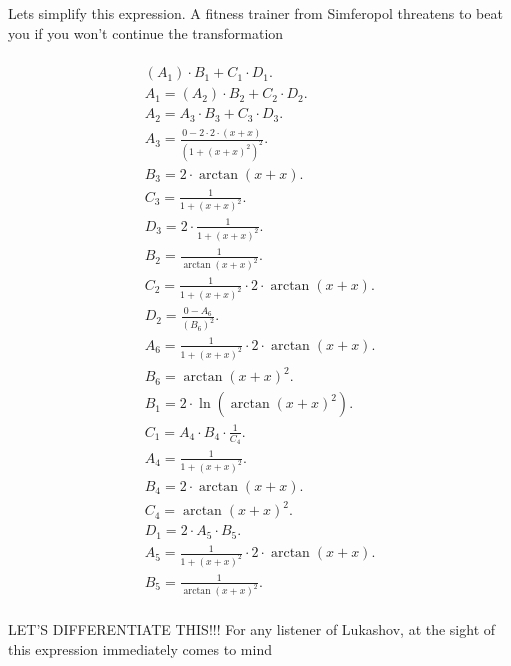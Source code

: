 \documentclass[12pt,a4paper]{extreport}
\begin{document}
Lets simplify this expression.
A fitness trainer from Simferopol\cite{SJ} threatens to beat you if you won't continue the transformation 

\begin{multline}
\\
(A_{1}) \cdot B_{1} + C_{1} \cdot D_{1}.\\
A_{1} = (A_{2}) \cdot B_{2} + C_{2} \cdot D_{2}.\\
A_{2} = A_{3} \cdot B_{3} + C_{3} \cdot D_{3}.\\
A_{3} = \frac{0 - 2 \cdot 2 \cdot (x + x)}{(1 + (x + x) ^ {2}) ^ {2}}.\\
B_{3} = 2 \cdot \arctan(x + x).\\
C_{3} = \frac{1}{1 + (x + x) ^ {2}}.\\
D_{3} = 2 \cdot \frac{1}{1 + (x + x) ^ {2}}.\\
B_{2} = \frac{1}{\arctan(x + x) ^ {2}}.\\
C_{2} = \frac{1}{1 + (x + x) ^ {2}} \cdot 2 \cdot \arctan(x + x).\\
D_{2} = \frac{0 - A_{6}}{(B_{6}) ^ {2}}.\\
A_{6} = \frac{1}{1 + (x + x) ^ {2}} \cdot 2 \cdot \arctan(x + x).\\
B_{6} = \arctan(x + x) ^ {2}.\\
B_{1} = 2 \cdot \ln(\arctan(x + x) ^ {2}).\\
C_{1} = A_{4} \cdot B_{4} \cdot \frac{1}{C_{4}}.\\
A_{4} = \frac{1}{1 + (x + x) ^ {2}}.\\
B_{4} = 2 \cdot \arctan(x + x).\\
C_{4} = \arctan(x + x) ^ {2}.\\
D_{1} = 2 \cdot A_{5} \cdot B_{5}.\\
A_{5} = \frac{1}{1 + (x + x) ^ {2}} \cdot 2 \cdot \arctan(x + x).\\
B_{5} = \frac{1}{\arctan(x + x) ^ {2}}.\\
\end{multline}


LET'S DIFFERENTIATE THIS!!!
For any listener of Lukashov, at the sight of this expression immediately comes to mind 
\end{document}
